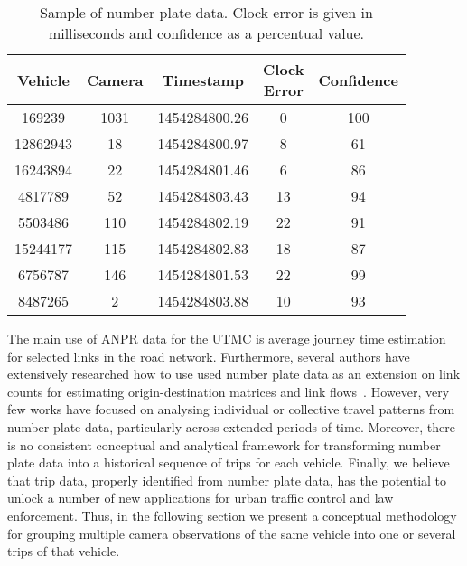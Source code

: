 \begin{table}[ht]
\centering
\tabcolsep=0.17cm
\small
\begin{tabular}{c c c c c}
  \hline
  Vehicle & Camera & Timestamp & \thead{Clock \\Error} & Confidence \\
  \hline
  169239 & 1031 & 1454284800.26 &   0 & 100 \\
  12862943 & 18 & 1454284800.97 &   8 &  61 \\
  16243894 & 22 & 1454284801.46 &   6 &  86 \\
  4817789 & 52 & 1454284803.43 &  13 &  94 \\
  5503486 & 110 & 1454284802.19 &  22 &  91 \\
  15244177 & 115 & 1454284802.83 &  18 &  87 \\
  6756787 & 146 & 1454284801.53 &  22 &  99 \\
  8487265 & 2 & 1454284803.88 &  10 &  93 \\
   \hline
\end{tabular}
\caption{Sample of number plate data. Clock error is given in milliseconds and confidence as a percentual value.}
\label{t:np_data_example}
\vspace{-0.5cm}
\end{table}

The main use of ANPR data for the UTMC is average journey time estimation for selected links in the road network. Furthermore, several authors have extensively researched how to use used number plate data as an extension on link counts for estimating origin-destination matrices and link flows~\cite{Castillo2010, Castillo2008, Hazelton2012}. However, very few works have focused on analysing individual or collective travel patterns from number plate data, particularly across extended periods of time. Moreover, there is no consistent conceptual and analytical framework for transforming number plate data into a historical sequence of trips for each vehicle. Finally, we believe that trip data, properly identified from number plate data, has the potential to unlock a number of new applications for urban traffic control and law enforcement. Thus, in the following section we present a conceptual methodology for grouping multiple camera observations of the same vehicle into one or several trips of that vehicle.
